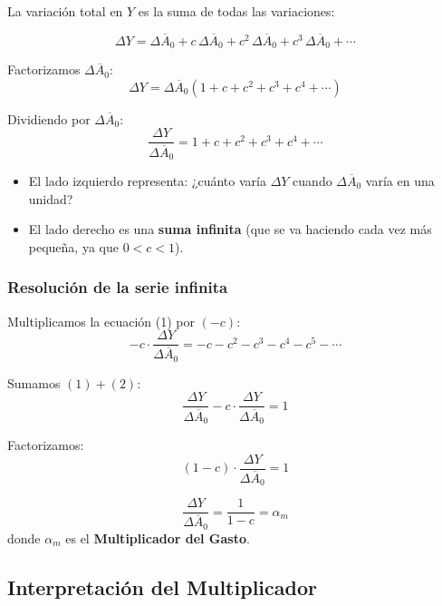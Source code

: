\documentclass[11pt,a4paper]{article}
\newcommand{\barvar}[1]{\overline{#1}}
\begin{document}
La variación total en $Y$ es la suma de todas las variaciones:

\begin{resultadobox}
\[
\Delta Y = \Delta \barvar{A}_0 + c\,\Delta \barvar{A}_0 + c^2\,\Delta \barvar{A}_0 + c^3\,\Delta \barvar{A}_0 + \cdots
\]
\end{resultadobox}

Factorizamos $\Delta \barvar{A}_0$:
\[
\Delta Y = \Delta \barvar{A}_0 \left(1 + c + c^2 + c^3 + c^4 + \cdots \right)
\]

Dividiendo por $\Delta \barvar{A}_0$:
\begin{equation}
\frac{\Delta Y}{\Delta \barvar{A}_0} = 1 + c + c^2 + c^3 + c^4 + \cdots \tag{1}
\end{equation}

\begin{itemize}
    \item El lado izquierdo representa: ¿cuánto varía $\Delta Y$ cuando $\Delta \barvar{A}_0$ varía en una unidad?
    \item El lado derecho es una \textbf{suma infinita} (que se va haciendo cada vez más pequeña, ya que $0 < c < 1$).
\end{itemize}

\subsubsection{Resolución de la serie infinita}

Multiplicamos la ecuación (1) por $(-c)$:
\begin{equation}
-c \cdot \frac{\Delta Y}{\Delta \barvar{A}_0} = -c - c^2 - c^3 - c^4 - c^5 - \cdots \tag{2}
\end{equation}

Sumamos $(1) + (2)$:
\[
\frac{\Delta Y}{\Delta \barvar{A}_0} - c \cdot \frac{\Delta Y}{\Delta \barvar{A}_0} = 1
\]

Factorizamos:
\[
(1 - c) \cdot \frac{\Delta Y}{\Delta \barvar{A}_0} = 1
\]

\begin{resultadobox}
\begin{equation}
\frac{\Delta Y}{\Delta \barvar{A}_0} = \frac{1}{1-c} = \alpha_m \tag{3}
\end{equation}
donde $\alpha_m$ es el \textbf{Multiplicador del Gasto}.
\end{resultadobox}

\subsection{Interpretación del Multiplicador}
\end{document}
